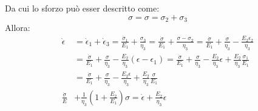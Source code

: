 Da cui lo sforzo può esser descritto come:
\begin{equation}
\sigma = \sigma = \sigma_2 + \sigma_3
\end{equation}
Allora:
\begin{equation}
\begin{split}
\dot{\epsilon} &= \dot{\epsilon}_1 + \dot{\epsilon}_3 = \frac{\dot{\sigma}_1}{E_1} + \frac{\sigma_3}{\eta_3} = \frac{\dot{\sigma}}{E_1} + \frac{\sigma - \sigma_2}{\eta_3} = \frac{\dot{\sigma}}{E_1} + \frac{\sigma}{\eta_3} - \frac{E_2 \epsilon_2}{\eta_3}\\
&= \frac{\dot{\sigma}}{E_1} + \frac{\sigma}{\eta_3} - \frac{E_2}{\eta_3}(\epsilon - \epsilon_1) = \frac{\dot{\sigma}}{E_1} + \frac{\sigma}{\eta_3} - \frac{E_2}{\eta_3}\epsilon + \frac{E_2}{\eta_3}\frac{\sigma_1}{E_1}\\
&= \frac{\dot{\sigma}}{E_1} + \frac{\sigma}{\eta_3} - \frac{E_2\epsilon}{\eta_3} + \frac{E_2}{\eta_3}\frac{\sigma}{E_1}\\
\frac{\dot{\sigma}}{E} &+ \frac{1}{\eta_3}\left(1 + \frac{E_2}{E_1}\right)\sigma = \dot{\epsilon} + \frac{E_2}{\eta_3}\epsilon
\end{split}
\end{equation}

